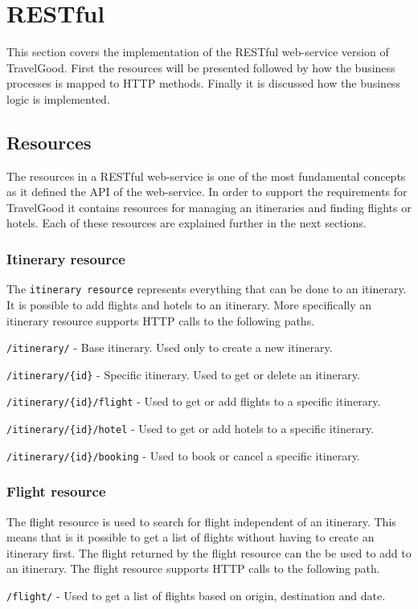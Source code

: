 \section{RESTful}
This section covers the implementation of the RESTful web-service version of TravelGood. First the resources will be presented followed by how the business processes is mapped to HTTP methods. Finally it is discussed how the business logic is implemented.

\subsection{Resources}
The resources in a RESTful web-service is one of the most fundamental concepts as it defined the API of the web-service. In order to support the requirements for TravelGood it contains resources for managing an itineraries and finding flights or hotels. Each of these resources are explained further in the next sections.

\subsubsection{Itinerary resource}
The \texttt{itinerary resource} represents everything that can be done to an itinerary. It is possible to add flights and hotels to an itinerary. More specifically an itinerary resource supports HTTP calls to the following paths.
\begin{description}
	\item \texttt{/itinerary/} - Base itinerary. Used only to create a new itinerary.
	\item \texttt{/itinerary/\{id\}} - Specific itinerary. Used to get or delete an itinerary.
	\item \texttt{/itinerary/\{id\}/flight} - Used to get or add flights to a specific itinerary.
	\item \texttt{/itinerary/\{id\}/hotel} - Used to get or add hotels to a specific itinerary.
	\item \texttt{/itinerary/\{id\}/booking} - Used to book or cancel a specific itinerary.
\end{description}

\subsubsection{Flight resource}
The flight resource is used to search for flight independent of an itinerary. This means that is it possible to get a list of flights without having to create an itinerary first. The flight returned by the flight resource can the be used to add to an itinerary. The flight resource supports HTTP calls to the following path.
\begin{description}
	\item \texttt{/flight/} - Used to get a list of flights based on origin, destination and date.
\end{description}

